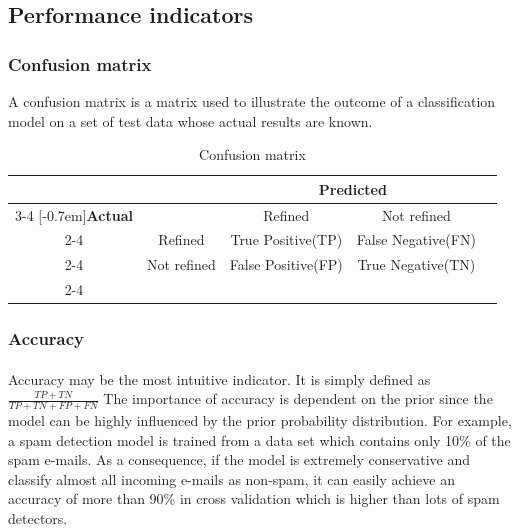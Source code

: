 
\subsection{Performance indicators}
\label{lr_ml:indicators}
\subsubsection{Confusion matrix}
A confusion matrix is a matrix used to illustrate the outcome of a classification model on a set of test data whose actual results are known.
    \begin{table}[]
        \centering
        \caption{Confusion matrix}
        \label{my-label}
        \begin{tabular}{ccccc}
                                & & \multicolumn{2}{c}{\textbf{Predicted}}                 &  \\ \cline{3-4}
                                \multirow{3}{*}[-0.7em]{\textbf{Actual}} &
                                & \multicolumn{1}{|c|}{Refined}        & \multicolumn{1}{c|}{Not refined}    &  \\ \cline{2-4}        
                                & \multicolumn{1}{|c}{Refined}     & \multicolumn{1}{|c|}{True Positive(TP)}  & \multicolumn{1}{c|}{False Negative(FN)} &  \\ \cline{2-4}
                                & \multicolumn{1}{|c}{Not refined} & \multicolumn{1}{|c|}{False Positive(FP)} & \multicolumn{1}{c|}{True Negative(TN)}  &  \\ \cline{2-4}
        \end{tabular}
    \end{table}
%
\subsubsection{Accuracy}
\paragraph{}
Accuracy may be the most intuitive indicator.
It is simply defined as $\frac{TP+TN}{TP+TN+FP+FN}$
The importance of accuracy is dependent on the prior since the model can be highly influenced by the prior probability distribution.
For example, a spam detection model is trained from a data set which contains only 10\% of the spam e-mails.
As a consequence, if the model is extremely conservative and classify almost all incoming e-mails as non-spam, it can easily achieve an accuracy of more than 90\% in cross validation which is higher than lots of spam detectors.

